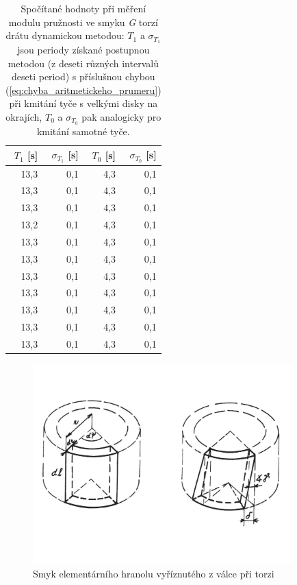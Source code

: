 \documentclass[english]{article}
\begin{document}
\clearpage
\begin{table}[htbp]
  \centering
	       \begin{tabular}{|r|r|r|r|}
	           \hline
	           $T_1$ [s] & $\sigma_{T_1}$ [s] & $T_0$ [s] & $\sigma_{T_0}$ [s] \bigstrut\\
	           \hline
	           13,3  & 0,1   & 4,3   & 0,1 \bigstrut\\
	           \hline
	           13,3  & 0,1   & 4,3   & 0,1 \bigstrut\\
	           \hline
	           13,3  & 0,1   & 4,3   & 0,1 \bigstrut\\
	           \hline
	           13,2  & 0,1   & 4,3   & 0,1 \bigstrut\\
	           \hline
	           13,3  & 0,1   & 4,3   & 0,1 \bigstrut\\
	           \hline
	           13,3  & 0,1   & 4,3   & 0,1 \bigstrut\\
	           \hline
	           13,3  & 0,1   & 4,3   & 0,1 \bigstrut\\
	           \hline
	           13,3  & 0,1   & 4,3   & 0,1 \bigstrut\\
	           \hline
	           13,3  & 0,1   & 4,3   & 0,1 \bigstrut\\
	           \hline
	           13,3  & 0,1   & 4,3   & 0,1 \bigstrut\\
	           \hline
	           13,3  & 0,1   & 4,3   & 0,1 \bigstrut\\
	           \hline
	           \end{tabular}%
	                 
 \caption{Spočítané hodnoty při měření modulu pružnosti ve smyku \emph{G} torzí drátu dynamickou metodou: $T_1$ a $\sigma_{T_1}$ jsou periody získané postupnou metodou (z deseti různých intervalů deseti period) s příslušnou chybou (\ref{eq:chyba_aritmetickeho_prumeru}) při kmitání tyče s velkými disky na okrajích, $T_0$ a $\sigma_{T_0}$ pak analogicky pro kmitání samotné tyče.}
 \label{tab:G2}%
\end{table}%

	\begin{figure}[h!]
	\centering
	\includegraphics[width=10cm]{att/torze_element.pdf}
	\vspace*{-2cm}
	\caption{Smyk elementárního hranolu vyříznutého z válce při torzi \cite{bib:zadani}}
	\label{fig:torze_element}
	\end{figure}
\end{document}
